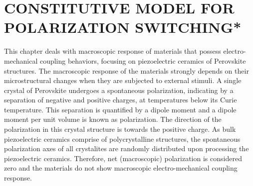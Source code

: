 %
%
%

\chapter{\uppercase {constitutive model for polarization switching*}}
\label{section:chap_02_constitutive_model_for_polarization_switching}
This chapter deals with macroscopic response of materials that possess electro-mechanical coupling behaviors,
 focusing on piezoelectric ceramics of Perovskite structures. 
The macroscopic response of the materials strongly depends on their 
microstructural changes when they are subjected to external stimuli.
A single crystal of Perovskite undergoes a spontaneous polarization, indicating
by a separation of negative and positive charges, at temperatures below its Curie temperature. 
This separation is quantified by a dipole moment and a dipole moment per unit volume is known as polarization. 
The direction of the polarization in this crystal structure is towards the positive charge. 
As bulk piezoelectric ceramics comprise of polycrystalline structures,
 the spontaneous polarization axes of all crystalites are
 randomly distributed upon processing the piezoelectric ceramics. 
Therefore, net (macroscopic) polarization is considered zero and the materials do not show macroscopic electro-mechanical coupling response. 
